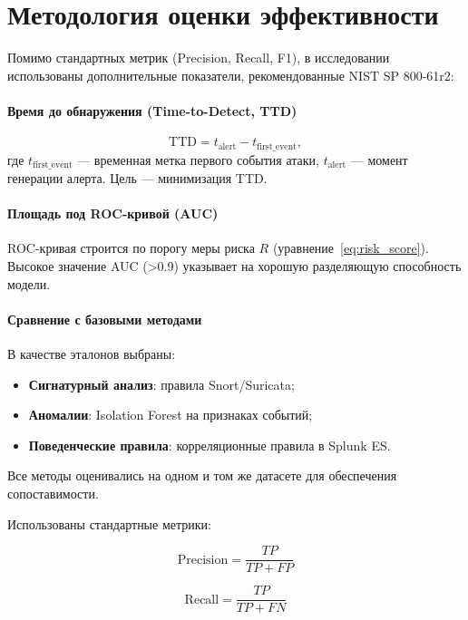 \documentclass{article}
\begin{document}
\section{Методология оценки эффективности}\label{sec:ch4/sect3}

Помимо стандартных метрик (Precision, Recall, F1), в исследовании использованы дополнительные показатели, рекомендованные NIST SP 800-61r2:

\paragraph{Время до обнаружения (Time-to-Detect, TTD)}
\[
\text{TTD} = t_{\text{alert}} - t_{\text{first\_event}},
\]
где $t_{\text{first\_event}}$ — временная метка первого события атаки, $t_{\text{alert}}$ — момент генерации алерта. Цель — минимизация TTD.

\paragraph{Площадь под ROC-кривой (AUC)}
ROC-кривая строится по порогу меры риска $R$ (уравнение~\ref{eq:risk_score}). Высокое значение AUC (>0.9) указывает на хорошую разделяющую способность модели.

\paragraph{Сравнение с базовыми методами}
В качестве эталонов выбраны:
\begin{itemize}
    \item \textbf{Сигнатурный анализ}: правила Snort/Suricata;
    \item \textbf{Аномалии}: Isolation Forest на признаках событий;
    \item \textbf{Поведенческие правила}: корреляционные правила в Splunk ES.
\end{itemize}

Все методы оценивались на одном и том же датасете для обеспечения сопоставимости.

Использованы стандартные метрики:

\begin{equation}
    \text{Precision} = \frac{TP}{TP + FP}
    \label{eq:precision}
\end{equation}

\begin{equation}
    \text{Recall} = \frac{TP}{TP + FN}
    \label{eq:recall}
\end{equation}
\end{document}
